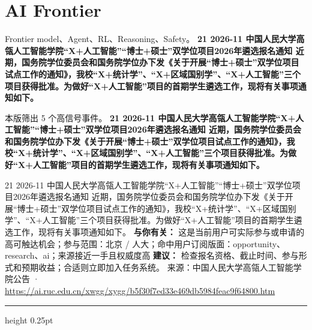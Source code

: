 \documentclass[10.5pt]{ctexart}
\begin{document}
\section*{AI Frontier}
{\color{ormuted} Frontier model、Agent、RL、Reasoning、Safety。}
\vspace{2mm}
{\LARGE\bfseries 21 2026-11 中国人民大学高瓴人工智能学院“X+人工智能”“博士+硕士”双学位项目2026年遴选报名通知 近期，国务院学位委员会和国务院学位办下发《关于开展“博士+硕士”双学位项目试点工作的通知》，我校“X+统计学”、“X+区域国别学”、“X+人工智能”三个项目获得批准。为做好“X+人工智能”项目的首期学生遴选工作，现将有关事项通知如下。}\par
\vspace{1mm}
{\color{ormuted} 本版筛出 5 个高信号事件。}
\vspace{3mm}
{\Large\bfseries 21 2026-11 中国人民大学高瓴人工智能学院“X+人工智能”“博士+硕士”双学位项目2026年遴选报名通知 近期，国务院学位委员会和国务院学位办下发《关于开展“博士+硕士”双学位项目试点工作的通知》，我校“X+统计学”、“X+区域国别学”、“X+人工智能”三个项目获得批准。为做好“X+人工智能”项目的首期学生遴选工作，现将有关事项通知如下。}\par
21 2026-11 中国人民大学高瓴人工智能学院“X+人工智能”“博士+硕士”双学位项目2026年遴选报名通知 近期，国务院学位委员会和国务院学位办下发《关于开展“博士+硕士”双学位项目试点工作的通知》，我校“X+统计学”、“X+区域国别学”、“X+人工智能”三个项目获得批准。为做好“X+人工智能”项目的首期学生遴选工作，现将有关事项通知如下。
\textbf{与你有关：} 这是当前用户可实际参与或申请的高可触达机会；参与范围：北京 / 人大；命中用户订阅版面：opportunity、research、ai；来源接近一手且权威度高
\textbf{建议：} 检查报名资格、截止时间、参与形式和预期收益；合适则立即加入任务系统。
{\footnotesize\color{ormuted} 来源：中国人民大学高瓴人工智能学院公告 · \url{https://ai.ruc.edu.cn/xwgg/xygg/b5f30f7ed33e469db5984feac9f64800.htm}}
\vspace{4mm}
\hrule height 0.25pt
\vspace{3mm}
\end{document}
